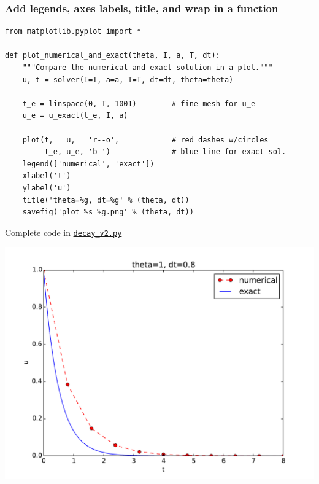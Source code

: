 \documentclass{beamer}
\begin{document}
\begin{frame}
\frametitle{Add legends, axes labels, title, and wrap in a function}

\begin{verbatim}
from matplotlib.pyplot import *

def plot_numerical_and_exact(theta, I, a, T, dt):
    """Compare the numerical and exact solution in a plot."""
    u, t = solver(I=I, a=a, T=T, dt=dt, theta=theta)

    t_e = linspace(0, T, 1001)        # fine mesh for u_e
    u_e = u_exact(t_e, I, a)

    plot(t,   u,   'r--o',            # red dashes w/circles
         t_e, u_e, 'b-')              # blue line for exact sol.
    legend(['numerical', 'exact'])
    xlabel('t')
    ylabel('u')
    title('theta=%g, dt=%g' % (theta, dt))
    savefig('plot_%s_%g.png' % (theta, dt))
\end{verbatim}

Complete code in
\href{{http://tinyurl.com/ofkw6kc/alg/decay_v2.py}}{\nolinkurl{decay_v2.py}}



\centerline{\includegraphics[width=0.8\linewidth]{fig-alg/decay_v2.pdf}}
\end{frame}
\end{document}
